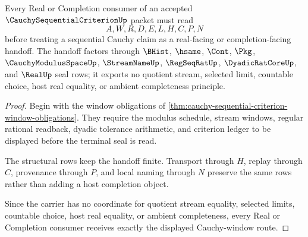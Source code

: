 \begin{theorem}
\label{thm:cauchy-sequential-criterion-real-handoff}
Every Real or Completion consumer of an accepted $\CauchySequentialCriterionUp$ packet must read
$$
A,W,R,D,E,L,H,C,P,N
$$
before treating a sequential Cauchy claim as a real-facing or completion-facing handoff. The handoff factors through $\BHist$, $\hsame$, $\Cont$, $\Pkg$, $\CauchyModulusSpaceUp$, $\StreamNameUp$, $\RegSeqRatUp$, $\DyadicRatCoreUp$, and $\RealUp$ seal rows; it exports no quotient stream, selected limit, countable choice, host real equality, or ambient completeness principle.
\end{theorem}
\begin{proof}
Begin with the window obligations of \autoref{thm:cauchy-sequential-criterion-window-obligations}. They require the modulus schedule, stream windows, regular rational readback, dyadic tolerance arithmetic, and criterion ledger to be displayed before the terminal seal is read.

The structural rows keep the handoff finite. Transport through $H$, replay through $C$, provenance through $P$, and local naming through $N$ preserve the same rows rather than adding a host completion object.

Since the carrier has no coordinate for quotient stream equality, selected limits, countable choice, host real equality, or ambient completeness, every Real or Completion consumer receives exactly the displayed Cauchy-window route.
\end{proof}




